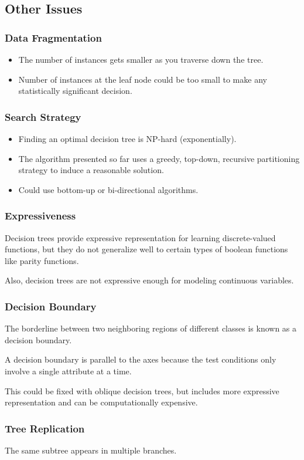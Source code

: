 \subsection{Other Issues}
\subsubsection{Data Fragmentation}
\begin{itemize}
    \item The number of instances gets smaller as you traverse down the tree.
    \item Number of instances at the leaf node could be too small to make any statistically significant decision.
\end{itemize}

\subsubsection{Search Strategy}
\begin{itemize}
    \item Finding an optimal decision tree is NP-hard (exponentially).
    \item The algorithm presented so far uses a greedy, top-down, recursive partitioning strategy to induce a reasonable solution.
    \item Could use bottom-up or bi-directional algorithms.
\end{itemize}

\subsubsection{Expressiveness}
Decision trees provide expressive representation for learning discrete-valued functions, but they do not generalize well to certain types of boolean functions like parity functions.

Also, decision trees are not expressive enough for modeling continuous variables.

\subsubsection{Decision Boundary}
The borderline between two neighboring regions of different classes is known as a decision boundary.

A decision boundary is parallel to the axes because the test conditions only involve a single attribute at a time.

This could be fixed with oblique decision trees, but includes more expressive representation and can be computationally expensive.

\subsubsection{Tree Replication}
The same subtree appears in multiple branches.

